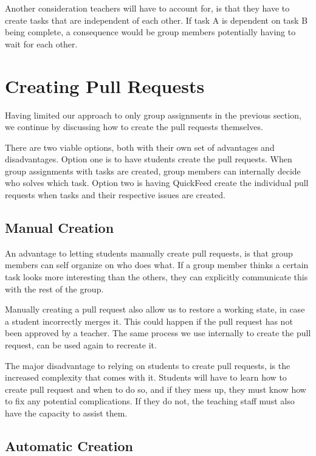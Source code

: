 Another consideration teachers will have to account for, is that they have to create tasks that are independent of each other.
If task A is dependent on task B being complete, a consequence would be group members potentially having to wait for each other.

\section{Creating Pull Requests}
\label{sec:creating-pull-requests}

Having limited our approach to only group assignments in the previous section, we continue by discussing how to create the pull requests themselves.

There are two viable options, both with their own set of advantages and disadvantages.
Option one is to have students create the pull requests.
When group assignments with tasks are created, group members can internally decide who solves which task.
Option two is having QuickFeed create the individual pull requests when tasks and their respective issues are created.

\subsection{Manual Creation}

An advantage to letting students manually create pull requests, is that group members can self organize on who does what.
If a group member thinks a certain task looks more interesting than the others, they can explicitly communicate this with the rest of the group.

Manually creating a pull request also allow us to restore a working state, in case a student incorrectly merges it.
This could happen if the pull request has not been approved by a teacher.
The same process we use internally to create the pull request, can be used again to recreate it.

The major disadvantage to relying on students to create pull requests, is the increased complexity that comes with it.
Students will have to learn how to create pull request and when to do so, and if they mess up, they must know how to fix any potential complications.
If they do not, the teaching staff must also have the capacity to assist them.

\subsection{Automatic Creation}

